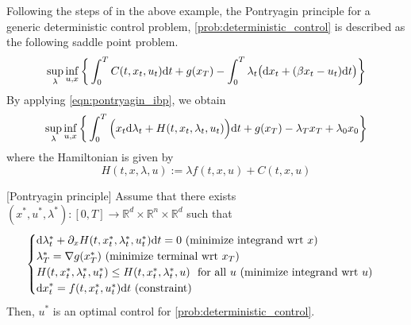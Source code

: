 \documentclass[11pt]{book}
\newcommand{\dd}{\text{\normalfont d}}
\newcommand{\dt}{\text{\normalfont d}t}
\newcommand{\dx}{\text{\normalfont d}x}
\begin{document}
Following the steps of in the above example, the Pontryagin principle for a generic deterministic control problem, \ref{prob:deterministic_control} is described as the following saddle point problem.
\begin{equation}\label{eqn:sup_inf}
    \sup_{\lambda}\inf_{u,x}\bigg\{\int_0^TC(t,x_t,u_t) {{\dt}} +g(x_T) - \int_0^T \lambda_t \big({\dx}_t + (\beta x_t  - u_t ){{\dt}}\big)\bigg\}
\end{equation}
By applying \eqref{eqn:pontryagin_ibp}, we obtain 
\begin{equation}
    \sup_{\lambda}\inf_{u,x}\bigg\{\int_0^T\Big(x_t {\dd}\lambda_t+ H(t,x_t,\lambda_t,u_t)\Big) {{\dt}} +g(x_T) - \lambda_T x_T + \lambda_0 x_0\bigg\}
\end{equation}
where the Hamiltonian is given by 
\begin{equation}
    H(t,x,\lambda,u):=\lambda f(t,x,u)+ C(t,x,u)
\end{equation} 
\begin{thm}\label{thm:pontryagin_deterministic}
    [Pontryagin principle]
    Assume that there exists $(x^*,u^*,\lambda^*):[0,T]\to\mathbb{R}^d\times\mathbb{R}^n\times\mathbb{R}^d$ such that
    \begin{equation}\label{eqn:pontryagin_determinimstic}
    \begin{cases}
        {\dd}\lambda^*_t+ \partial_x H(t,x^*_t,\lambda^*_t,u^*_t){{\dt}}=0~ (\textrm{minimize integrand wrt $x$})\\
        \lambda^*_T=\nabla g(x^*_T) ~(\textrm{minimize terminal wrt $x_T$})\\
        H(t,x^*_t,\lambda^*_t,u^*_t)\le H(t,x^*_t,\lambda^*_t,u)~\textrm{ for all } u ~(\textrm{minimize integrand wrt $u$})\\
        {\dx}^*_t = f(t,x^*_t,u^*_t) {{\dt}} ~(\textrm{constraint})
        \end{cases}
\end{equation}
Then, $u^*$ is an optimal control for \eqref{prob:deterministic_control}.
\end{thm}
\end{document}
